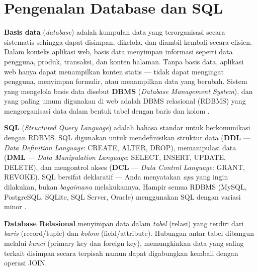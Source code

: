 \section{Pengenalan Database dan SQL}

\textbf{Basis data} (\textit{database}) adalah kumpulan data yang terorganisasi secara sistematis sehingga dapat disimpan, dikelola, dan diambil kembali secara efisien. Dalam konteks aplikasi web, basis data menyimpan informasi seperti data pengguna, produk, transaksi, dan konten halaman. Tanpa basis data, aplikasi web hanya dapat menampilkan konten statis --- tidak dapat mengingat pengguna, menyimpan formulir, atau menampilkan data yang berubah. Sistem yang mengelola basis data disebut \textbf{DBMS} (\textit{Database Management System}), dan yang paling umum digunakan di web adalah DBMS relasional (RDBMS) yang mengorganisasi data dalam bentuk tabel dengan baris dan kolom \cite{mysqlDocs}.

\textbf{SQL} (\textit{Structured Query Language}) adalah bahasa standar untuk berkomunikasi dengan RDBMS. SQL digunakan untuk mendefinisikan struktur data (\textbf{DDL} --- \textit{Data Definition Language}: CREATE, ALTER, DROP), memanipulasi data (\textbf{DML} --- \textit{Data Manipulation Language}: SELECT, INSERT, UPDATE, DELETE), dan mengontrol akses (\textbf{DCL} --- \textit{Data Control Language}: GRANT, REVOKE). SQL bersifat deklaratif --- Anda menyatakan \textit{apa} yang ingin dilakukan, bukan \textit{bagaimana} melakukannya. Hampir semua RDBMS (MySQL, PostgreSQL, SQLite, SQL Server, Oracle) menggunakan SQL dengan variasi minor \cite{mysqlGettingStarted}.

\begin{konsep}
\textbf{Database Relasional} menyimpan data dalam \textit{tabel} (relasi) yang terdiri dari \textit{baris} (record/tuple) dan \textit{kolom} (field/attribute). Hubungan antar tabel dibangun melalui \textit{kunci} (primary key dan foreign key), memungkinkan data yang saling terkait disimpan secara terpisah namun dapat digabungkan kembali dengan operasi JOIN.
\end{konsep}

